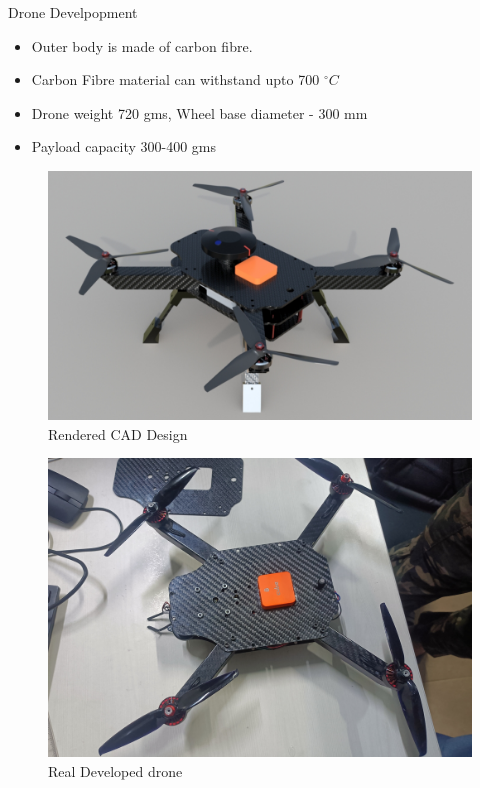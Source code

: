 \documentclass[10pt]{beamer}
\begin{document}
\begin{frame}{Drone Develpopment}
    \begin{itemize}
        \item Outer body is made of carbon fibre.
        \item Carbon Fibre material can withstand upto 700 $^\circ C$
        \item Drone weight 720 gms, Wheel base diameter - 300 mm
        \item Payload capacity 300-400 gms
    \end{itemize}
    \begin{minipage}{0.47\textwidth}

        \begin{figure}[h!]
            \centering
            \includegraphics[scale=0.12]{render_drone.jpg}
            \caption{Rendered CAD Design}
            \label{fig: render_drone}
        \end{figure}

    \end{minipage}
    \begin{minipage}{0.47\textwidth}
        \vspace{0.2cm}
        \begin{figure}[h!]
            \centering
            \includegraphics[scale=0.04]{real_drone.jpg}
            \caption{Real Developed drone}
            \label{fig: real_drone}
        \end{figure}

    \end{minipage}
\end{frame}
\end{document}
